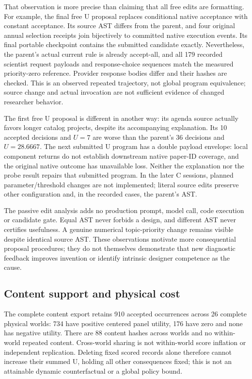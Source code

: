 That observation is more precise than claiming that all free edits are
formatting. For example, the final free U proposal replaces conditional native
acceptance with constant acceptance. Its source AST differs from the parent,
and four original annual selection receipts join bijectively to committed
native execution events. Its final portable checkpoint contains the submitted
candidate exactly. Nevertheless, the parent's actual current rule is already
accept-all, and all 179 recorded scientist request payloads and response-choice
sequences match the measured priority-zero reference. Provider response bodies
differ and their hashes are checked. This is an observed repeated trajectory,
not global program equivalence; source change and actual invocation are not
sufficient evidence of changed researcher behavior.

The first free U proposal is different in another way: its agenda source
actually favors longer catalog projects, despite its accompanying explanation.
Its 10 accepted decisions and $U=7$ are worse than the parent's 36 decisions
and $U=28.6667$. The next submitted U program has a double payload envelope:
local component returns do not establish downstream native paper-ID coverage,
and the original native outcome has unavailable loss. Neither the explanation
nor the probe result repairs that submitted program. In the later C sessions,
planned parameter/threshold changes are not implemented; literal source edits
preserve other configuration and, in the recorded cases, the parent's AST.

The passive edit analysis adds no production prompt, model call, code execution
or candidate gate. Equal AST never forbids a design, and different AST never
certifies usefulness. A genuine numerical topic-priority change remains visible
despite identical source AST. These observations motivate more consequential
proposal procedures; they do not themselves demonstrate that new diagnostic
feedback improves invention or identify intrinsic designer competence as the cause.

\subsection{Content support and physical cost}
The complete content export retains 910 accepted occurrences across 26 complete
physical worlds: 734 have positive centered panel utility, 176 have zero and
none has negative utility. There are 88 content hashes across worlds and no
within-world repeated content. Cross-world sharing is not within-world score
inflation or independent replication. Deleting fixed scored records alone
therefore cannot increase their summed U, holding all other consequences fixed;
this is not an attainable dynamic counterfactual or a global policy bound.

